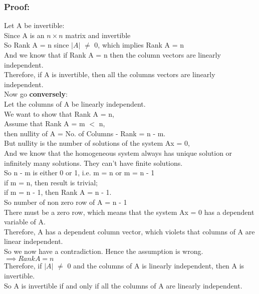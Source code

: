 \documentclass[11pt]{article}
\begin{document}
\subsubsection*{Proof:}
Let A be invertible:\\
Since A is an $n\times n$ matrix and invertible\\
So Rank A = n since $\lvert A \rvert$ $\neq$ 0, which implies Rank A = n\\
And we know that if Rank A = n then the column vectors are linearly independent.\\
Therefore, if A is invertible, then all the columns vectors are linearly independent.\\
Now go \textbf{conversely}:\\
Let the columns of A be linearly independent.\\
We want to show that Rank A = n,\\
Assume that Rank A = m $<$ n,\\
then nullity of A = No. of Columns - Rank = n - m.\\
But nullity is the number of solutions of the system Ax = 0,\\
And we know that the homogeneous system always has unique solution or infinitely many solutions. They can't have finite solutions.\\
So n - m is either 0 or 1, i.e. m = n or m = n - 1\\
if m = n, then result is trivial;\\
if m = n - 1, then Rank A = n - 1.\\
So number of non zero row of A = n - 1\\
There must be a zero row, which means that the system Ax = 0 has a dependent variable of A.\\
Therefore, A has a dependent column vector, which violets that columns of A are linear independent.\\
So we now have a contradiction. Hence the assumption is wrong. \\
$\implies RankA = n$\\
Therefore, if $\lvert A \rvert$ $\neq$ 0 and the columns of A is linearly independent, then A is invertible.\\
So A is invertible if and only if all the columns of A are linearly independent. \\
\end{document}
